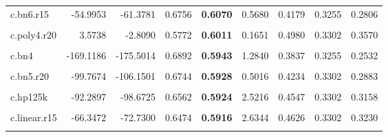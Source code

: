 \documentclass[
  12pt,
]{article}
\begin{document}
\begin{table}[H]
{\begin{tabular}[t]{lrrr>{}rrrrr}
c.bn6.r15 & -54.9953 & -61.3781 & 0.6756 & \textbf{0.6070} & 0.5680 & 0.4179 & 0.3255 & 0.2806\\
\addlinespace
\cellcolor{gray!6}{c.bn2.r15} & \cellcolor{gray!6}{-83.9469} & \cellcolor{gray!6}{-90.3297} & \cellcolor{gray!6}{0.6749} & \textbf{\cellcolor{gray!6}{0.6047}} & \cellcolor{gray!6}{0.1349} & \cellcolor{gray!6}{0.4761} & \cellcolor{gray!6}{0.3302} & \cellcolor{gray!6}{0.3357}\\
c.poly4.r20 & 3.5738 & -2.8090 & 0.5772 & \textbf{0.6011} & 0.1651 & 0.4980 & 0.3302 & 0.3570\\
\cellcolor{gray!6}{BIS Basel gap} & \cellcolor{gray!6}{-121.5910} & \cellcolor{gray!6}{-127.9738} & \cellcolor{gray!6}{0.6733} & \textbf{\cellcolor{gray!6}{0.5960}} & \cellcolor{gray!6}{3.0578} & \cellcolor{gray!6}{0.4441} & \cellcolor{gray!6}{0.3255} & \cellcolor{gray!6}{0.3032}\\
c.bn4 & -169.1186 & -175.5014 & 0.6892 & \textbf{0.5943} & 1.2840 & 0.3837 & 0.3255 & 0.2532\\
\cellcolor{gray!6}{c.bn4.r15} & \cellcolor{gray!6}{-89.6147} & \cellcolor{gray!6}{-95.9975} & \cellcolor{gray!6}{0.6669} & \textbf{\cellcolor{gray!6}{0.5929}} & \cellcolor{gray!6}{0.4435} & \cellcolor{gray!6}{0.4792} & \cellcolor{gray!6}{0.2925} & \cellcolor{gray!6}{0.3152}\\
\addlinespace
c.bn5.r20 & -99.7674 & -106.1501 & 0.6744 & \textbf{0.5928} & 0.5016 & 0.4234 & 0.3302 & 0.2883\\
\cellcolor{gray!6}{c.stm.r15} & \cellcolor{gray!6}{-79.5531} & \cellcolor{gray!6}{-85.9358} & \cellcolor{gray!6}{0.6575} & \textbf{\cellcolor{gray!6}{0.5924}} & \cellcolor{gray!6}{2.0027} & \cellcolor{gray!6}{0.4778} & \cellcolor{gray!6}{0.3160} & \cellcolor{gray!6}{0.3281}\\
c.hp125k & -92.2897 & -98.6725 & 0.6562 & \textbf{0.5924} & 2.5216 & 0.4547 & 0.3302 & 0.3158\\
\cellcolor{gray!6}{c.hp221k} & \cellcolor{gray!6}{-106.8842} & \cellcolor{gray!6}{-113.2670} & \cellcolor{gray!6}{0.6656} & \textbf{\cellcolor{gray!6}{0.5921}} & \cellcolor{gray!6}{2.6641} & \cellcolor{gray!6}{0.4561} & \cellcolor{gray!6}{0.3160} & \cellcolor{gray!6}{0.3079}\\
c.linear.r15 & -66.3472 & -72.7300 & 0.6474 & \textbf{0.5916} & 2.6344 & 0.4626 & 0.3302 & 0.3230\\
\addlinespace
\cellcolor{gray!6}{c.hp400k.r15} & \cellcolor{gray!6}{-67.1228} & \cellcolor{gray!6}{-73.5055} & \cellcolor{gray!6}{0.6472} & \textbf{\cellcolor{gray!6}{0.5912}} & \cellcolor{gray!6}{2.6223} & \cellcolor{gray!6}{0.4592} & \cellcolor{gray!6}{0.3255} & \cellcolor{gray!6}{0.3168}\\
\bottomrule
\end{tabular}}
\end{table}
\end{document}

